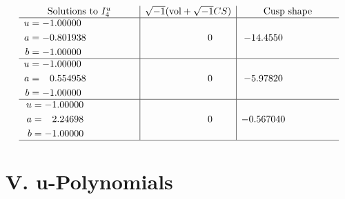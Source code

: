 \documentclass[1p]{elsarticle_modified}
\theoremstyle{definition}
\newcommand{\I}{\sqrt{-1}}
\begin{document}
$$\begin{array}{c|c|c}  
\text{Solutions to }I^u_{4}& \I (\text{vol} + \sqrt{-1}CS) & \text{Cusp shape}\\
 \hline 
\begin{aligned}
u &= -1.00000\phantom{ +0.000000I} \\
a &= -0.801938\phantom{ +0.000000I} \\
b &= -1.00000\phantom{ +0.000000I}\end{aligned}
 & \phantom{-0.000000 } 0 & -14.4550\phantom{ +0.000000I} \\ \hline\begin{aligned}
u &= -1.00000\phantom{ +0.000000I} \\
a &= \phantom{-}0.554958\phantom{ +0.000000I} \\
b &= -1.00000\phantom{ +0.000000I}\end{aligned}
 & \phantom{-0.000000 } 0 & -5.97820\phantom{ +0.000000I} \\ \hline\begin{aligned}
u &= -1.00000\phantom{ +0.000000I} \\
a &= \phantom{-}2.24698\phantom{ +0.000000I} \\
b &= -1.00000\phantom{ +0.000000I}\end{aligned}
 & \phantom{-0.000000 } 0 & -0.567040\phantom{ +0.000000I}\\
 \hline 
 \end{array}$$\newpage
\newpage\renewcommand{\arraystretch}{1}
\centering \section*{ V. u-Polynomials}
\end{document}
